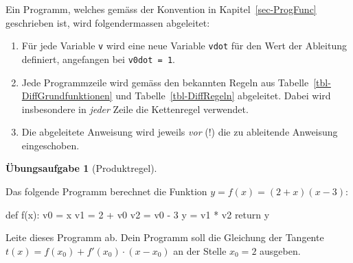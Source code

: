 \documentclass[
  letterpaper,
  DIV=11,
  oneside]{scrreprt}
\newenvironment{Shaded}{\begin{snugshade}}{\end{snugshade}}
\newcommand{\ControlFlowTok}[1]{\textcolor[rgb]{0.00,0.23,0.31}{#1}}
\newcommand{\DecValTok}[1]{\textcolor[rgb]{0.68,0.00,0.00}{#1}}
\newcommand{\KeywordTok}[1]{\textcolor[rgb]{0.00,0.23,0.31}{#1}}
\newcommand{\NormalTok}[1]{\textcolor[rgb]{0.00,0.23,0.31}{#1}}
\newcommand{\OperatorTok}[1]{\textcolor[rgb]{0.37,0.37,0.37}{#1}}
\providecommand{\tightlist}{%
  \setlength{\itemsep}{0pt}\setlength{\parskip}{0pt}}\usepackage{longtable,booktabs,array}
\theoremstyle{definition}
\newtheorem{exercise}{Übungsaufgabe}[chapter]
\theoremstyle{definition}
\theoremstyle{remark}
\begin{document}
\begin{tcolorbox}[enhanced jigsaw, title=\textcolor{quarto-callout-important-color}{\faExclamation}\hspace{0.5em}{Konvention}, colbacktitle=quarto-callout-important-color!10!white, bottomrule=.15mm, titlerule=0mm, colback=white, breakable, colframe=quarto-callout-important-color-frame, bottomtitle=1mm, toptitle=1mm, leftrule=.75mm, arc=.35mm, left=2mm, rightrule=.15mm, toprule=.15mm, opacitybacktitle=0.6, opacityback=0, coltitle=black]

Ein Programm, welches gemäss der Konvention in
Kapitel~\ref{sec-ProgFunc} geschrieben ist, wird folgendermassen
abgeleitet:

\begin{enumerate}
\def\labelenumi{\arabic{enumi}.}
\tightlist
\item
  Für jede Variable \texttt{v} wird eine neue Variable \texttt{vdot} für
  den Wert der Ableitung definiert, angefangen bei \texttt{v0dot\ =\ 1}.
\item
  Jede Programmzeile wird gemäss den bekannten Regeln aus
  Tabelle~\ref{tbl-DiffGrundfunktionen} und Tabelle~\ref{tbl-DiffRegeln}
  abgeleitet. Dabei wird insbesondere in \emph{jeder} Zeile die
  Kettenregel verwendet.
\item
  Die abgeleitete Anweisung wird jeweils \emph{vor} (!) die zu
  ableitende Anweisung eingeschoben.
\end{enumerate}

\end{tcolorbox}

\leavevmode{}%
\begin{exercise}[Produktregel]\label{exr-SADProduktregel}

Das folgende Programm berechnet die Funktion \(y = f(x) = (2+x)(x-3)\):

\begin{Shaded}
\begin{Highlighting}[]
\KeywordTok{def}\NormalTok{ f(x):}
\NormalTok{    v0 }\OperatorTok{=}\NormalTok{ x}
\NormalTok{    v1 }\OperatorTok{=} \DecValTok{2} \OperatorTok{+}\NormalTok{ v0}
\NormalTok{    v2 }\OperatorTok{=}\NormalTok{ v0 }\OperatorTok{{-}} \DecValTok{3}
\NormalTok{    y }\OperatorTok{=}\NormalTok{ v1 }\OperatorTok{*}\NormalTok{ v2}
    \ControlFlowTok{return}\NormalTok{ y}
\end{Highlighting}
\end{Shaded}

Leite dieses Programm ab. Dein Programm soll die Gleichung der Tangente
\(t(x) = f(x_0) + f'(x_0)\cdot (x-x_0)\) an der Stelle \(x_0 = 2\)
ausgeben.

\end{exercise}
\end{document}
